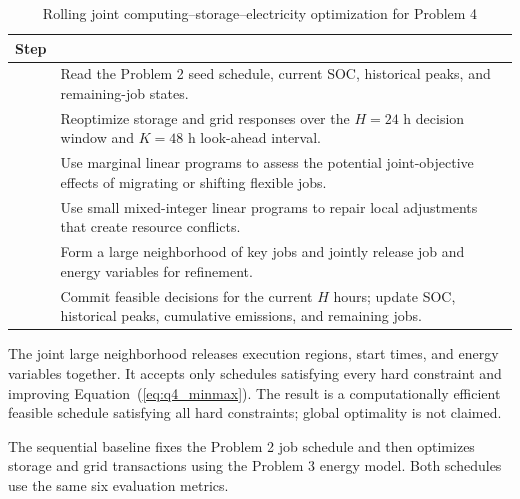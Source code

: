 \begin{table}[H]
	\centering
    \caption{Rolling joint computing--storage--electricity optimization for Problem 4}
	\label{tab:q4_algorithm}

	\fontsize{10.5pt}{12pt}\selectfont
	\renewcommand{\arraystretch}{0.88}

	\begin{tabular}{
			>{\centering\arraybackslash}p{}
			>{\raggedright\arraybackslash}p{}}
		\toprule
        \textbf{Step} & \multicolumn{1}{c}{\textbf{Operation}}\\
		\midrule

        1 & Read the Problem 2 seed schedule, current SOC, historical peaks, and remaining-job states.\\

        2 & Reoptimize storage and grid responses over the $H=24$ h decision window and $K=48$ h look-ahead interval.\\

        3 & Use marginal linear programs to assess the potential joint-objective effects of migrating or shifting flexible jobs.\\

        4 & Use small mixed-integer linear programs to repair local adjustments that create resource conflicts.\\

        5 & Form a large neighborhood of key jobs and jointly release job and energy variables for refinement.\\

        6 & Commit feasible decisions for the current $H$ hours; update SOC, historical peaks, cumulative emissions, and remaining jobs.\\

		\bottomrule
	\end{tabular}
\end{table}


The joint large neighborhood releases execution regions, start times, and energy variables together. It accepts only schedules satisfying every hard constraint and improving Equation~(\ref{eq:q4_minmax}). The result is a computationally efficient feasible schedule satisfying all hard constraints; global optimality is not claimed.

The sequential baseline fixes the Problem 2 job schedule and then optimizes storage and grid transactions using the Problem 3 energy model. Both schedules use the same six evaluation metrics.

